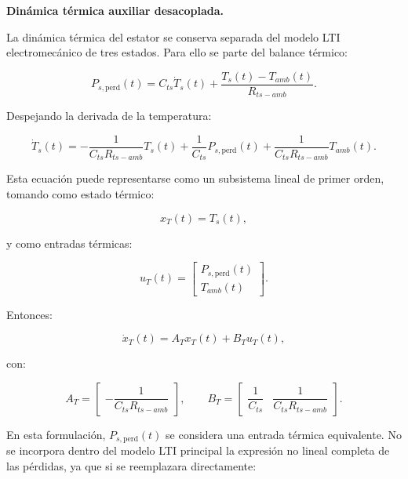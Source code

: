 \documentclass[10pt,a4paper]{article}
\begin{document}
\medskip

\noindent\textbf{Dinámica térmica auxiliar desacoplada.}

La dinámica térmica del estator se conserva separada del modelo LTI electromecánico de tres estados. Para ello se parte del balance térmico:

\begin{equation*}
	P_{s,\mathrm{perd}}(t)
	=
	C_{ts}\dot{T}_s(t)
	+
	\frac{T_s(t)-T_{amb}(t)}{R_{ts-amb}}.
\end{equation*}

Despejando la derivada de la temperatura:

\begin{equation}
	\dot{T}_s(t)
	=
	-\frac{1}{C_{ts}R_{ts-amb}}T_s(t)
	+\frac{1}{C_{ts}}P_{s,\mathrm{perd}}(t)
	+\frac{1}{C_{ts}R_{ts-amb}}T_{amb}(t).
	\label{eq:termica_lineal_psperd}
\end{equation}

Esta ecuación puede representarse como un subsistema lineal de primer orden, tomando como estado térmico:

\begin{equation*}
	x_T(t)=T_s(t),
\end{equation*}

y como entradas térmicas:

\begin{equation*}
	u_T(t)=
	\begin{bmatrix}
		P_{s,\mathrm{perd}}(t)\\
		T_{amb}(t)
	\end{bmatrix}.
\end{equation*}

Entonces:

\begin{equation}
	\dot{x}_T(t)
	=
	A_Tx_T(t)+B_Tu_T(t),
	\label{eq:termica_lineal_estado}
\end{equation}

con:

\begin{equation*}
	A_T
	=
	\begin{bmatrix}
		-\dfrac{1}{C_{ts}R_{ts-amb}}
	\end{bmatrix},
	\qquad
	B_T
	=
	\begin{bmatrix}
		\dfrac{1}{C_{ts}} &
		\dfrac{1}{C_{ts}R_{ts-amb}}
	\end{bmatrix}.
\end{equation*}

En esta formulación, $P_{s,\mathrm{perd}}(t)$ se considera una entrada térmica equivalente. No se incorpora dentro del modelo LTI principal la expresión no lineal completa de las pérdidas, ya que si se reemplazara directamente:
\end{document}
